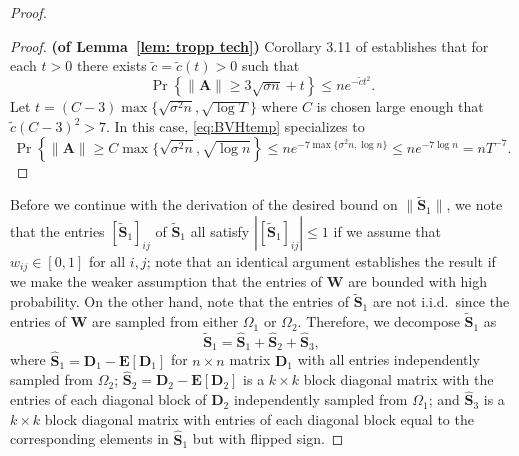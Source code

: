 \documentclass[twoside,11pt]{article}
\newcommand{\E}{\mathbf{E}}
\newcommand{\St}{\bs{\tilde S}}
\DeclareMathOperator{\pr}{Pr}
\newcommand{\bs}{\boldsymbol}
\newcommand{\W}{\bs {W}}
\newcommand{\0}{\bs{0}}
\newcommand{\sbra}[1] {\ensuremath{ \left[ #1\right]}} %
\newcommand{\bra}[1]{\ensuremath{\left\{ #1 \right\}}} %
\begin{document}
{\begin{proof}
\begin{proof} 
\newcommand{\ct}{\tilde c}
	{\bf (of Lemma~\ref{lem: tropp tech})}
	Corollary 3.11 of \cite{bandeira2016sharp} establishes that for each $t>0$
	there exists $\tilde c = \tilde c(t) > 0$ such that
	\begin{equation} \label{eq:BVHtemp}
		\pr \bra{ \|\bs{A}\| \ge 3 \sqrt{\sigma n} + t } \le n e^{-\ct t^2}.
	\end{equation}
	Let $t = (C-3) \max\{ \sqrt{\sigma^2 n}, \sqrt{\log T} \}$ where $C$ is chosen large enough that $\ct 	(C-3)^2 > 7$.
	In this case, \eqref{eq:BVHtemp} specializes to
	\[ 
		\pr \bra{\|\bs{A}\| \ge C \max\{ \sqrt{\sigma^2 n}, \sqrt{\log n} }
		\le n e^{-7 \max\{\sigma^2 n, \log n\}} \le n e^{-7 \log n} = n T^{-7}.
	\]
\end{proof}

Before we continue with the derivation of the desired bound on \(\|\St_1\|\), we note that
the entries $[\St_1]_{ij}$ of $\St_1$ all satisfy $|[\St_1]_{ij}| \leq 1$ if we assume that \(w_{ij} \in [0,1]\)
for all \(i,j\); note that an identical argument establishes the result if we make the weaker assumption that
the entries of \(\W\) are bounded with high probability.
On the other hand, note that the
entries of $\St_1$ are not i.i.d.~since the entries of $\bs{W}$ are sampled from either $\Omega_1$ or $\Omega_2$. 
Therefore, we decompose $\St_1$ as
\[
\St_1 = \hat{\bs{S}}_1+\hat{\bs{S}}_2+\hat{\bs{S}}_3,
\]
where 
$\hat{\bs{S}}_1 = \bs{D}_1 - \E\sbra{\bs{D}_1 }$ for $n \times n$ matrix $\bs{D}_1$ with all entries independently sampled from $\Omega_2$; $\hat{\bs{S}}_2 = \bs{D}_2 - \E\sbra{\bs{D}_2 }$ is a $k \times k$ block diagonal matrix with the entries of each diagonal block of $\bs{D}_2$ independently sampled from $\Omega_1$; and $\hat{\bs{S}}_3$ is a $k \times k$ block diagonal matrix with entries of each diagonal block equal to the corresponding elements in $\hat{\bs{S}}_1$ but with flipped sign. 


\end{proof}}
\end{document}
